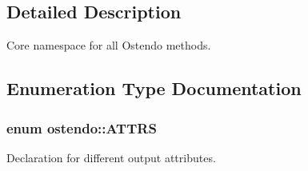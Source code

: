 \subsection{Detailed Description}
Core namespace for all Ostendo methods. 

\subsection{Enumeration Type Documentation}
\subsubsection[{\texorpdfstring{A\+T\+T\+RS}{ATTRS}}]{\setlength{\rightskip}{0pt plus 5cm}enum {\bf ostendo\+::\+A\+T\+T\+RS}}\hypertarget{namespaceostendo_a804202ffcab31ce4e007ff0c9d5249c6}{}\label{namespaceostendo_a804202ffcab31ce4e007ff0c9d5249c6}


Declaration for different output attributes. 

